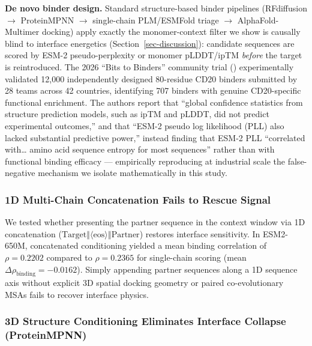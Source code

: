 \documentclass[
  11pt,
  us-letterpaper,
  DIV=11,
  numbers=noendperiod]{scrartcl}
\begin{document}
\textbf{De novo binder design.} Standard structure-based binder
pipelines (RFdiffusion \(\to\) ProteinMPNN \(\to\) single-chain
PLM/ESMFold triage \(\to\) AlphaFold-Multimer docking) apply exactly the
monomer-context filter we show is causally blind to interface energetics
(Section~\ref{sec-discussion}): candidate sequences are scored by ESM-2
pseudo-perplexity or monomer pLDDT/ipTM \emph{before} the target is
reintroduced. The 2026 ``Bits to Binders'' community trial
() experimentally
validated 12,000 independently designed 80-residue CD20 binders
submitted by 28 teams across 42 countries, identifying 707 binders with
genuine CD20-specific functional enrichment. The authors report that
``global confidence statistics from structure prediction models, such as
ipTM and pLDDT, did not predict experimental outcomes,'' and that
``ESM-2 pseudo log likelihood (PLL) also lacked substantial predictive
power,'' instead finding that ESM-2 PLL ``correlated with\ldots{} amino
acid sequence entropy for most sequences'' rather than with functional
binding efficacy --- empirically reproducing at industrial scale the
false-negative mechanism we isolate mathematically in this study.

\subsubsection{1D Multi-Chain Concatenation Fails to Rescue
Signal}\label{d-multi-chain-concatenation-fails-to-rescue-signal}

We tested whether presenting the partner sequence in the context window
via 1D concatenation
(\(\text{Target} \mathbin{\Vert} \langle\text{eos}\rangle \mathbin{\Vert} \text{Partner}\))
restores interface sensitivity. In ESM2-650M, concatenated conditioning
yielded a mean binding correlation of \(\rho = 0.2202\) compared to
\(\rho = 0.2365\) for single-chain scoring (mean
\(\Delta\rho_{\text{binding}} = \mathbf{-0.0162}\)). Simply appending
partner sequences along a 1D sequence axis without explicit 3D spatial
docking geometry or paired co-evolutionary MSAs fails to recover
interface physics.

\subsubsection{3D Structure Conditioning Eliminates Interface Collapse
(ProteinMPNN)}\label{d-structure-conditioning-eliminates-interface-collapse-proteinmpnn}
\end{document}
